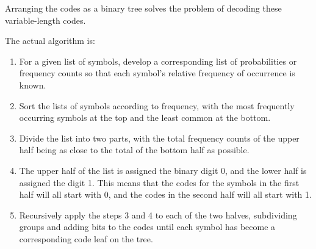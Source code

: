 \documentclass[12pt, a4paper]{report}
\begin{document}
Arranging the codes as a binary tree solves the problem of decoding these variable-length codes.

The actual algorithm is:

\begin{enumerate}
    \item For a given list of symbols, develop a corresponding list of probabilities or frequency counts so that each symbol's
    relative frequency of occurrence is known.
    \item Sort the lists of symbols according to frequency, with the most frequently occurring symbols at the top and the least
    common at the bottom.
    \item Divide the list into two parts, with the total frequency counts of the upper half being as close to the total of the
    bottom half as possible.
    \item The upper half of the list is assigned the binary digit 0, and the lower half is assigned the digit 1. This means
    that the codes for the symbols in the first half will all start with 0, and the codes in the second half will all start
    with 1.
    \item Recursively apply the steps 3 and 4 to each of the two halves, subdividing groups and adding bits to the codes
    until each symbol has become a corresponding code leaf on the tree.
\end{enumerate}
\end{document}
